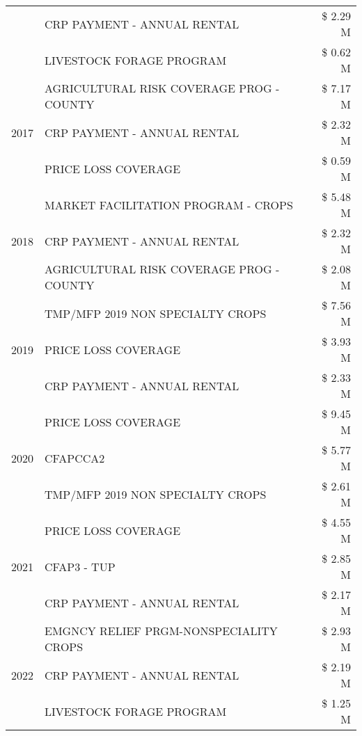 \begin{tabular}{llr}
 & CRP PAYMENT - ANNUAL RENTAL & \$ 2.29 M \\
 & LIVESTOCK FORAGE PROGRAM & \$ 0.62 M \\
\cline{1-3}
\multirow[t]{3}{*}{2017} & AGRICULTURAL RISK COVERAGE PROG - COUNTY & \$ 7.17 M \\
 & CRP PAYMENT - ANNUAL RENTAL & \$ 2.32 M \\
 & PRICE LOSS COVERAGE & \$ 0.59 M \\
\cline{1-3}
\multirow[t]{3}{*}{2018} & MARKET FACILITATION PROGRAM - CROPS & \$ 5.48 M \\
 & CRP PAYMENT - ANNUAL RENTAL & \$ 2.32 M \\
 & AGRICULTURAL RISK COVERAGE PROG - COUNTY & \$ 2.08 M \\
\cline{1-3}
\multirow[t]{3}{*}{2019} & TMP/MFP 2019 NON SPECIALTY CROPS & \$ 7.56 M \\
 & PRICE LOSS COVERAGE & \$ 3.93 M \\
 & CRP PAYMENT - ANNUAL RENTAL & \$ 2.33 M \\
\cline{1-3}
\multirow[t]{3}{*}{2020} & PRICE LOSS COVERAGE & \$ 9.45 M \\
 & CFAPCCA2 & \$ 5.77 M \\
 & TMP/MFP 2019 NON SPECIALTY CROPS & \$ 2.61 M \\
\cline{1-3}
\multirow[t]{3}{*}{2021} & PRICE LOSS COVERAGE & \$ 4.55 M \\
 & CFAP3 - TUP & \$ 2.85 M \\
 & CRP PAYMENT - ANNUAL RENTAL & \$ 2.17 M \\
\cline{1-3}
\multirow[t]{3}{*}{2022} & EMGNCY RELIEF PRGM-NONSPECIALITY CROPS & \$ 2.93 M \\
 & CRP PAYMENT - ANNUAL RENTAL & \$ 2.19 M \\
 & LIVESTOCK FORAGE PROGRAM & \$ 1.25 M \\
\cline{1-3}
\bottomrule
\end{tabular}
